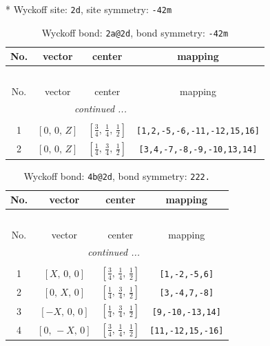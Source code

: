 \documentclass[fleqn,8pt]{jsarticle}
\begin{document}
* Wyckoff site: {\tt 2d}, site symmetry: {\tt -42m}
\renewcommand{\arraystretch}{1.2}
\begin{longtable}{cccc}
\caption{Wyckoff bond: {\tt 2a@2d}, bond symmetry: {\tt -42m}}
 \\
 \hline \hline
No. & vector & center & mapping \\ \hline \endfirsthead

\multicolumn{3}{l}{\tablename\ \thetable{}} \\
 \hline \hline
No. & vector & center & mapping \\ \hline \endhead

 \hline \hline
\multicolumn{3}{r}{\footnotesize\it continued ...} \\ \endfoot

 \hline \hline
\multicolumn{3}{r}{} \\ \endlastfoot

1 & $\left[ 0,\, 0,\, Z \right]$ & $\left[ \frac{3}{4},\, \frac{1}{4},\, \frac{1}{2} \right]$ & {\tt [1,2,-5,-6,-11,-12,15,16]} \\ \hline
2 & $\left[ 0,\, 0,\, Z \right]$ & $\left[ \frac{1}{4},\, \frac{3}{4},\, \frac{1}{2} \right]$ & {\tt [3,4,-7,-8,-9,-10,13,14]} \\
\end{longtable}
\renewcommand{\arraystretch}{1.2}
\begin{longtable}{cccc}
\caption{Wyckoff bond: {\tt 4b@2d}, bond symmetry: {\tt 222.}}
 \\
 \hline \hline
No. & vector & center & mapping \\ \hline \endfirsthead

\multicolumn{3}{l}{\tablename\ \thetable{}} \\
 \hline \hline
No. & vector & center & mapping \\ \hline \endhead

 \hline \hline
\multicolumn{3}{r}{\footnotesize\it continued ...} \\ \endfoot

 \hline \hline
\multicolumn{3}{r}{} \\ \endlastfoot

1 & $\left[ X,\, 0,\, 0 \right]$ & $\left[ \frac{3}{4},\, \frac{1}{4},\, \frac{1}{2} \right]$ & {\tt [1,-2,-5,6]} \\ \hline
2 & $\left[ 0,\, X,\, 0 \right]$ & $\left[ \frac{1}{4},\, \frac{3}{4},\, \frac{1}{2} \right]$ & {\tt [3,-4,7,-8]} \\ \hline
3 & $\left[ - X,\, 0,\, 0 \right]$ & $\left[ \frac{1}{4},\, \frac{3}{4},\, \frac{1}{2} \right]$ & {\tt [9,-10,-13,14]} \\ \hline
4 & $\left[ 0,\, - X,\, 0 \right]$ & $\left[ \frac{3}{4},\, \frac{1}{4},\, \frac{1}{2} \right]$ & {\tt [11,-12,15,-16]} \\
\end{longtable}
\end{document}
